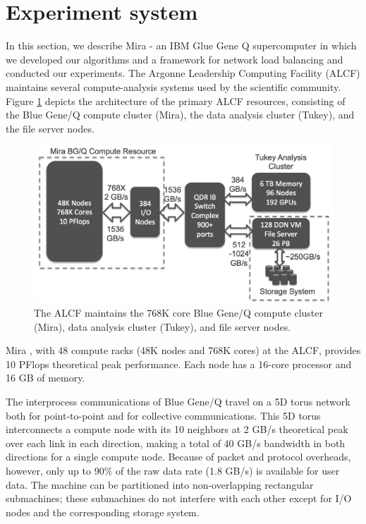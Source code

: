 \section{Experiment system}
\label{sec:system}

In this section, we describe Mira - an IBM Glue Gene Q supercomputer in which we developed our algorithms and a framework for network load balancing and conducted our experiments. The Argonne Leadership Computing Facility (ALCF) maintains several compute-analysis systems used by the scientific community. Figure \ref{fig:alcf} depicts the architecture of the primary ALCF resources, consisting of the Blue Gene/Q compute cluster (Mira), the data analysis cluster (Tukey), and the file server nodes.

\begin{figure}[!htb]
\vspace{-0.1in}
\centering
\includegraphics[scale=0.2]{figures/anl_facility}
\vspace{-0.1in}
\caption{The ALCF maintains the 768K core Blue Gene/Q compute cluster (Mira), data analysis cluster (Tukey), and file server nodes.}
\vspace{-0.1in}
\label{fig:alcf}
\end{figure}


Mira \cite{Chen:BGQ}, with 48 compute racks (48K nodes and 768K cores) at the ALCF, provides 10 PFlops theoretical peak performance. Each node has a 16-core processor and 16 GB of memory.

The interprocess communications of Blue Gene/Q travel on a 5D torus network both for point-to-point and for collective communications. This 5D torus interconnects a compute node with its 10 neighbors at 2 GB/s theoretical peak over each link in each direction, making a total of 40 GB/s bandwidth in both directions for a single compute node. Because of packet and protocol overheads, however, only up to 90\% of the raw data rate (1.8 GB/s) is available for user data. The machine can be partitioned into non-overlapping rectangular submachines; these submachines do not interfere with each other except for I/O nodes and the corresponding storage system.

